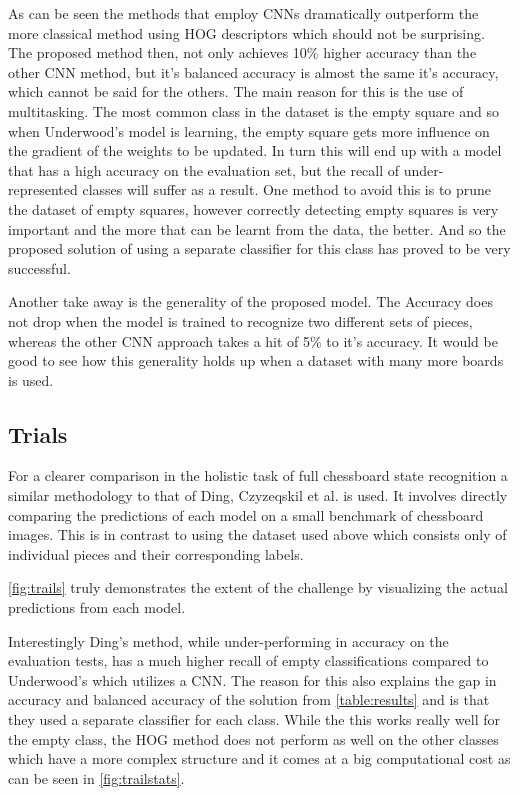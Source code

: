As can be seen the methods that employ CNNs dramatically outperform the more classical method using HOG descriptors which should not be surprising.  
The proposed method then, not only achieves 10\% higher accuracy than the other CNN method, but it's balanced accuracy is almost the same it's accuracy, 
which cannot be said for the others.  The main reason for this is the use of multitasking.  The most common class in the dataset is the empty square and so when 
Underwood's model is learning, the empty square gets more influence on the gradient of the weights to be updated.  In turn this will end up with a model that has a high 
accuracy on the evaluation set, but the recall of under-represented classes will suffer as a result. One method to avoid this is to prune the dataset 
of empty squares, however correctly detecting empty squares is very important and the more that can be learnt from the data, the better. 
And so the proposed solution of using a separate classifier for this class has proved to be very successful.

Another take away is the generality of the proposed model.  The Accuracy does not drop when the model is trained to recognize two different sets of pieces, whereas 
the other CNN approach takes a hit of 5\% to it's accuracy.  It would be good to see how this generality holds up when a dataset with many more boards is used.

\subsection{Trials}
For a clearer comparison in the holistic task of full chessboard state recognition a similar methodology 
to that of Ding, Czyzeqskil et al. \cite{Ding2016ChessVisionC, heatmap} is used.  It involves directly comparing the predictions of each model on a small 
benchmark of chessboard images.  This is in contrast to using the dataset used above which consists only of individual pieces and their corresponding labels.

\autoref{fig:trails} truly demonstrates the extent of the challenge by visualizing the actual predictions from each model.

Interestingly Ding's method, while under-performing in accuracy on the evaluation tests, has a much higher recall of empty classifications compared to Underwood's 
which utilizes a CNN.  The reason for this also explains the gap in accuracy and balanced accuracy of the solution from \autoref{table:results} and is that 
they used a separate classifier for each class.  While the this works really well for the empty class, the HOG method does not perform as well on the other 
classes which have a more complex structure and it comes at a big computational cost as can be seen in \autoref{fig:trailstats}.  

